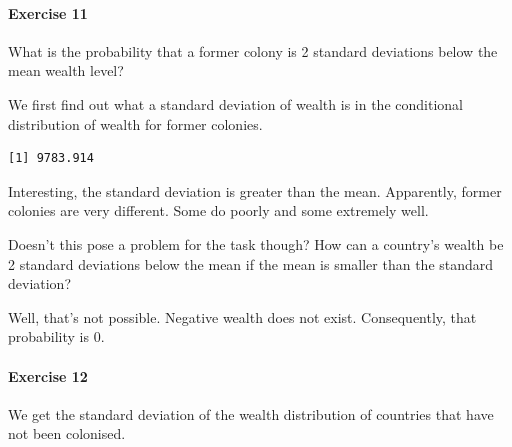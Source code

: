 \documentclass[]{article}
\newenvironment{Shaded}{\begin{snugshade}}{\end{snugshade}}
\newcommand{\KeywordTok}[1]{\textcolor[rgb]{0.13,0.29,0.53}{\textbf{#1}}}
\newcommand{\StringTok}[1]{\textcolor[rgb]{0.31,0.60,0.02}{#1}}
\newcommand{\CommentTok}[1]{\textcolor[rgb]{0.56,0.35,0.01}{\textit{#1}}}
\newcommand{\OperatorTok}[1]{\textcolor[rgb]{0.81,0.36,0.00}{\textbf{#1}}}
\newcommand{\NormalTok}[1]{#1}
\let\oldparagraph\paragraph
\renewcommand{\paragraph}[1]{\oldparagraph{#1}\mbox{}}
\theoremstyle{definition}
\theoremstyle{definition}
\theoremstyle{definition}
\theoremstyle{remark}
\begin{document}
\paragraph{Exercise 11}\label{exercise-11}

What is the probability that a former colony is 2 standard deviations
below the mean wealth level?

We first find out what a standard deviation of wealth is in the
conditional distribution of wealth for former colonies.

\begin{Shaded}
\end{Shaded}

\begin{verbatim}
[1] 9783.914
\end{verbatim}

Interesting, the standard deviation is greater than the mean.
Apparently, former colonies are very different. Some do poorly and some
extremely well.

Doesn't this pose a problem for the task though? How can a country's
wealth be 2 standard deviations below the mean if the mean is smaller
than the standard deviation?

Well, that's not possible. Negative wealth does not exist. Consequently,
that probability is 0.

\paragraph{Exercise 12}\label{exercise-12}

We get the standard deviation of the wealth distribution of countries
that have not been colonised.

\begin{Shaded}
\end{Shaded}
\end{document}
